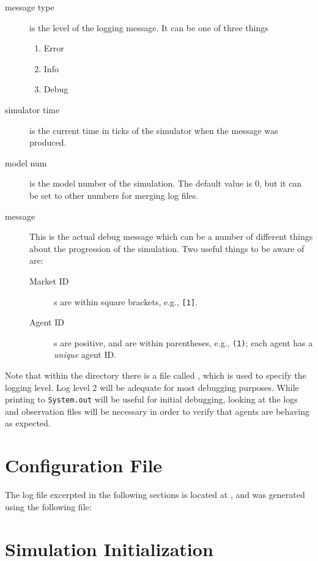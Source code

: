 \documentclass[11pt]{article}
\newcommand{\simspec}{../simulation_spec.json}
\begin{document}
\begin{description}
\item[message type] is the level of the logging message. It can be one of three things
  \begin{enumerate}[1)]
    \item Error
    \item Info
    \item Debug
  \end{enumerate}
\item[simulator time] is the current time in ticks of the simulator when the
  message was produced.
\item[model num] is the model number of the simulation. The default value
  is 0, but it can be set to other numbers for merging log files.
\item[message] This is the actual debug message which can be a number of
  different things about the progression of the simulation. Two useful things to
  be aware of are:
  \begin{description}
  \item[Market ID]s are within square brackets, e.g., \texttt{[1]}.
  \item[Agent ID]s are positive, and are within parentheses, e.g., \texttt{(1)};
    each agent has a \emph{unique} agent ID.
  \end{description}
\end{description}

Note that within the  directory there is a file called
, which is used to specify the logging level. Log level 2
will be adequate for most debugging purposes.
%
While printing to \texttt{System.out} will be useful for initial debugging,
looking at the logs and observation files will be necessary in order to verify
that agents are behaving as expected.

\section{Configuration File}

The log file excerpted in the following sections is located at
, and was generated using the
following  file:



\section{Simulation Initialization}
\end{document}
